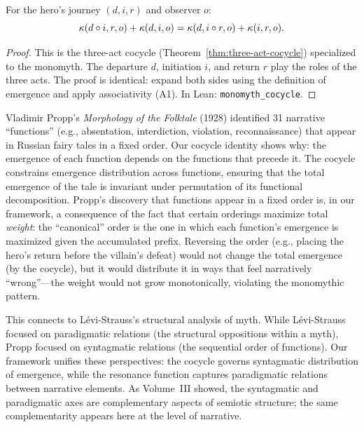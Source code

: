 
\begin{theorem}
\label{thm:monomyth-cocycle}
For the hero's journey $(d, i, r)$ and observer $o$:
\[
  \kappa(d \circ i, r, o) + \kappa(d, i, o) = \kappa(d, i \circ r, o) + \kappa(i, r, o).
\]
\end{theorem}

\begin{proof}
This is the three-act cocycle (Theorem~\ref{thm:three-act-cocycle}) specialized to the monomyth.  The departure $d$, initiation $i$, and return $r$ play the roles of the three acts.  The proof is identical: expand both sides using the definition of emergence and apply associativity (A1).  In Lean: \texttt{monomyth\_cocycle}.
\end{proof}

\begin{remark}
\label{rem:propp-morphology}
Vladimir Propp's \textit{Morphology of the Folktale} (1928) identified 31 narrative ``functions'' (e.g., absentation, interdiction, violation, reconnaissance) that appear in Russian fairy tales in a fixed order.  Our cocycle identity shows why: the emergence of each function depends on the functions that precede it.  The cocycle constrains emergence distribution across functions, ensuring that the total emergence of the tale is invariant under permutation of its functional decomposition.  Propp's discovery that functions appear in a fixed order is, in our framework, a consequence of the fact that certain orderings maximize total \emph{weight}: the ``canonical'' order is the one in which each function's emergence is maximized given the accumulated prefix.  Reversing the order (e.g., placing the hero's return before the villain's defeat) would not change the total emergence (by the cocycle), but it would distribute it in ways that feel narratively ``wrong''---the weight would not grow monotonically, violating the monomythic pattern.

This connects to L\'evi-Strauss's structural analysis of myth.  While L\'evi-Strauss focused on paradigmatic relations (the structural oppositions within a myth), Propp focused on syntagmatic relations (the sequential order of functions).  Our framework unifies these perspectives: the cocycle governs syntagmatic distribution of emergence, while the resonance function captures paradigmatic relations between narrative elements.  As Volume~III showed, the syntagmatic and paradigmatic axes are complementary aspects of semiotic structure; the same complementarity appears here at the level of narrative.
\end{remark}

